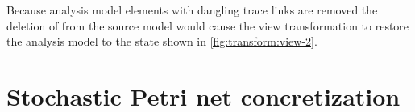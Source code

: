 \begin{runningExample}
  Because analysis model elements with dangling trace links are removed the deletion of  from the source model would cause the view transformation to restore the analysis model to the state shown in \cref{fig:transform:view-2}.
\end{runningExample}

\section{Stochastic Petri net concretization}
\label{chap:transform:concretizer}